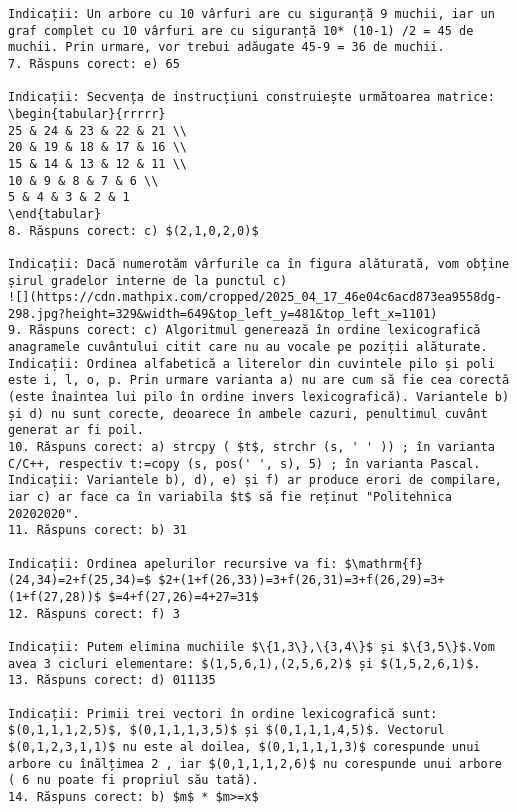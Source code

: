 \begin{verbatim}
Indicații: Un arbore cu 10 vârfuri are cu siguranță 9 muchii, iar un graf complet cu 10 vârfuri are cu siguranță 10* (10-1) /2 = 45 de muchii. Prin urmare, vor trebui adăugate 45-9 = 36 de muchii.
7. Răspuns corect: e) 65

Indicații: Secvența de instrucțiuni construiește următoarea matrice:
\begin{tabular}{rrrrr}
25 & 24 & 23 & 22 & 21 \\
20 & 19 & 18 & 17 & 16 \\
15 & 14 & 13 & 12 & 11 \\
10 & 9 & 8 & 7 & 6 \\
5 & 4 & 3 & 2 & 1
\end{tabular}
8. Răspuns corect: c) $(2,1,0,2,0)$

Indicații: Dacă numerotăm vârfurile ca în figura alăturată, vom obține șirul gradelor interne de la punctul c)
![](https://cdn.mathpix.com/cropped/2025_04_17_46e04c6acd873ea9558dg-298.jpg?height=329&width=649&top_left_y=481&top_left_x=1101)
9. Răspuns corect: c) Algoritmul generează în ordine lexicografică anagramele cuvântului citit care nu au vocale pe poziții alăturate.
Indicații: Ordinea alfabetică a literelor din cuvintele pilo și poli este i, l, o, p. Prin urmare varianta a) nu are cum să fie cea corectă (este înaintea lui pilo în ordine invers lexicografică). Variantele b) și d) nu sunt corecte, deoarece în ambele cazuri, penultimul cuvânt generat ar fi poil.
10. Răspuns corect: a) strcpy ( $t$, strchr (s, ' ' )) ; în varianta C/C++, respectiv t:=copy (s, pos(' ', s), 5) ; în varianta Pascal.
Indicații: Variantele b), d), e) și f) ar produce erori de compilare, iar c) ar face ca în variabila $t$ să fie reținut "Politehnica 20202020".
11. Răspuns corect: b) 31

Indicații: Ordinea apelurilor recursive va fi: $\mathrm{f}(24,34)=2+f(25,34)=$ $2+(1+f(26,33))=3+f(26,31)=3+f(26,29)=3+(1+f(27,28))$ $=4+f(27,26)=4+27=31$
12. Răspuns corect: f) 3

Indicații: Putem elimina muchiile $\{1,3\},\{3,4\}$ și $\{3,5\}$.Vom avea 3 cicluri elementare: $(1,5,6,1),(2,5,6,2)$ și $(1,5,2,6,1)$.
13. Răspuns corect: d) 011135

Indicații: Primii trei vectori în ordine lexicografică sunt: $(0,1,1,1,2,5)$, $(0,1,1,1,3,5)$ și $(0,1,1,1,4,5)$. Vectorul $(0,1,2,3,1,1)$ nu este al doilea, $(0,1,1,1,1,3)$ corespunde unui arbore cu înălțimea 2 , iar $(0,1,1,1,2,6)$ nu corespunde unui arbore ( 6 nu poate fi propriul său tată).
14. Răspuns corect: b) $m$ * $m>=x$


\end{verbatim}
